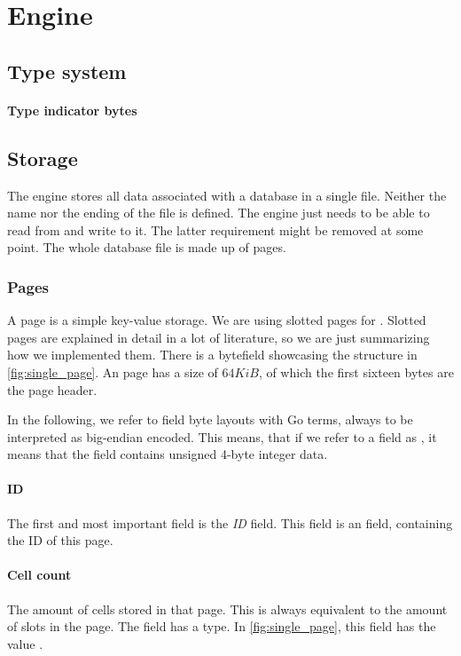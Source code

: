 \section{Engine}
\label{sec:engine}

\subsection{Type system}
\label{sec:types}

\paragraph{Type indicator bytes}
\label{par:type_indicator_bytes}

\subsection{Storage}
\label{sec:storage}
The engine stores all data associated with a database in a single file.
Neither the name nor the ending of the file is defined.
The engine just needs to be able to read from and write to it.
The latter requirement might be removed at some point.
The whole database file is made up of pages.

\subsubsection{Pages}
\label{sec:pages}
A page is a simple key-value storage.
We are using slotted pages for \xdb{}.
Slotted pages are explained in detail in a lot of literature, so we are just summarizing how we implemented them.
There is a bytefield showcasing the structure in \ref{fig:single_page}.
An \xdb{} page has a size of $64KiB$, of which the first sixteen bytes are the page header.

In the following, we refer to field byte layouts with Go terms, always to be interpreted as big-endian encoded.
This means, that if we refer to a field as , it means that the field contains unsigned 4-byte integer data.

\paragraph{ID}
The first and most important field is the \emph{ID} field.
This field is an  field, containing the ID of this page.

\paragraph{Cell count}
The amount of cells stored in that page.
This is always equivalent to the amount of slots in the page.
The field has a  type.
In \ref{fig:single_page}, this field has the value .

